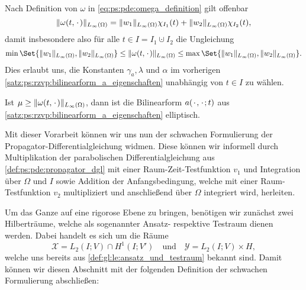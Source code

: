 \begin{Bemerkung}
\label{bemerkung:rzvp:bilinearform_zeitunabhaengig}
    Nach Definition von $\omega$ in \cref{eq:ps:pde:omega_definition} gilt offenbar
    \begin{equation}
        \lVert\omega(t, {\mkern2mu\cdot\mkern2mu})\rVert_{L_{\infty}(\Omega)} = \lVert w_{1}\rVert_{L_{\infty}(\Omega)} \chi_{I_{1}}(t) + \lVert w_{2}\rVert_{L_{\infty}(\Omega)} \chi_{I_{2}}(t),
    \end{equation}
    damit insbesondere also für alle $t \in I = I_{1} \cupdot I_{2}$ die Ungleichung
    \begin{equation}
        \min\Set{ \norm{w_{1}}_{L_{\infty}(\Omega)}, \norm{w_{2}}_{L_{\infty}(\Omega)} } \leq \norm{\omega(t, \blank)}_{L_{\infty}(\Omega)} \leq \max\Set{ \norm{w_{1}}_{L_{\infty}(\Omega)}, \norm{w_{2}}_{L_{\infty}(\Omega)} }.
    \end{equation}
    Dies erlaubt uns, die Konstanten $\gamma_{a}, \lambda$ und $\alpha$ im vorherigen \cref{satz:ps:rzvp:bilinearform_a_eigenschaften} unabhängig von $t \in I$ zu wählen.
\end{Bemerkung}

\begin{Korollar}
\label{kor:ps:rzvp:bilinearform_elliptisch}
    Ist $\mu \geq \lVert\omega(t, {\mkern2mu\cdot\mkern2mu})\rVert_{L_{\infty}(\Omega)}$, dann ist die Bilinearform $a({\mkern2mu\cdot\mkern2mu}, {\mkern2mu\cdot\mkern2mu}; t)$ aus \cref{satz:ps:rzvp:bilinearform_a_eigenschaften} elliptisch.
\end{Korollar}


Mit dieser Vorarbeit können wir uns nun der schwachen Formulierung der Propagator-Differentialgleichung widmen.
Diese können wir informell durch Multiplikation der parabolischen Differentialgleichung aus \cref{def:ps:pde:propagator_dgl} mit einer Raum-Zeit-Testfunktion $v_{1}$ und Integration über $\Omega$ und $I$ sowie Addition der Anfangsbedingung, welche mit einer Raum-Testfunktion $v_{2}$ multipliziert und anschließend über $\Omega$ integriert wird, herleiten.

Um das Ganze auf eine rigorose Ebene zu bringen, benötigen wir zunächst zwei Hilberträume, welche als sogenannter Ansatz- respektive Testraum dienen werden.
Dabei handelt es sich um die Räume
\begin{equation}
    \label{eq:ps:rzvp:ansatzraum_testraum}
    \mathcal X = L_{2}(I; V) \cap H^{1}(I; V')
    \quad \text{und} \quad
    \mathcal Y = L_{2}(I; V) \times H,
\end{equation}
welche uns bereits aus \cref{def:gl:le:ansatz_und_testraum} bekannt sind.
Damit können wir diesen Abschnitt mit der folgenden Definition der schwachen Formulierung abschließen:

